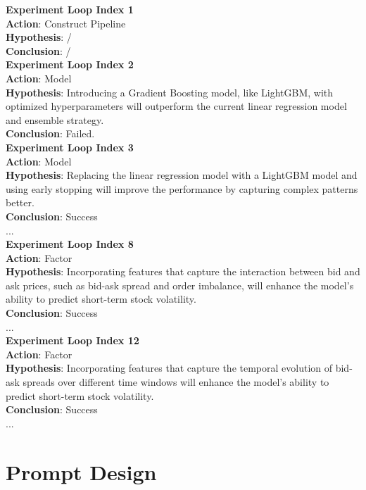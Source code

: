 \documentclass{article}
\begin{document}
\begin{tcolorbox}[
  colback=gray!5, 
  colframe=gray!80,
  title style={fontupper=\bfseries\large},
  title=Generated Hypotheses of \texttt{R\&D-Agent} on Optiver Realized Volatility Prediction Competition,
  breakable
]
\label{tab:hypothesis}
\textbf{Experiment Loop Index 1}\\
\textbf{Action}: Construct Pipeline\\
\textbf{Hypothesis}: /\\
\textbf{Conclusion}: /\\[1ex]
\textbf{Experiment Loop Index 2}\\
\textbf{Action}: Model\\
\textbf{Hypothesis}: Introducing a Gradient Boosting model, like LightGBM, with optimized hyperparameters will outperform the current linear regression model and ensemble strategy.\\
\textbf{Conclusion}: Failed.\\[1ex]
\textbf{Experiment Loop Index 3}\\
\textbf{Action}: Model\\
\textbf{Hypothesis}: Replacing the linear regression model with a LightGBM model and using early stopping will improve the performance by capturing complex patterns better.\\
\textbf{Conclusion}: Success\\
...\\
\textbf{Experiment Loop Index 8}\\
\textbf{Action}: Factor\\
\textbf{Hypothesis}: Incorporating features that capture the interaction between bid and ask prices, such as bid-ask spread and order imbalance, will enhance the model's ability to predict short-term stock volatility.\\
\textbf{Conclusion}: Success\\
...\\
\textbf{Experiment Loop Index 12}\\
\textbf{Action}: Factor\\
\textbf{Hypothesis}: Incorporating features that capture the temporal evolution of bid-ask spreads over different time windows will enhance the model’s ability to predict short-term stock volatility.\\
\textbf{Conclusion}: Success\\
...
\end{tcolorbox}

\section{Prompt Design}
\end{document}

